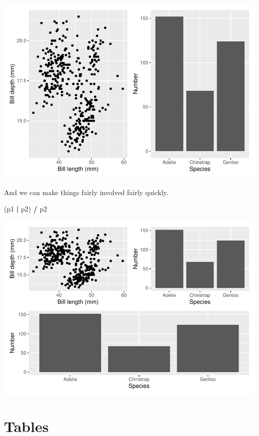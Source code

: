 \documentclass[
]{book}
\newenvironment{Shaded}{\begin{snugshade}}{\end{snugshade}}
\newcommand{\NormalTok}[1]{#1}
\newcommand{\OperatorTok}[1]{\textcolor[rgb]{0.81,0.36,0.00}{\textbf{#1}}}
\newcommand{\StringTok}[1]{\textcolor[rgb]{0.31,0.60,0.02}{#1}}
\begin{document}
\includegraphics{telling_stories_with_data_files/figure-latex/unnamed-chunk-92-1.pdf}

And we can make things fairly involved fairly quickly.

\begin{Shaded}
\begin{Highlighting}[]
\NormalTok{(p1 }\OperatorTok{|}\StringTok{ }\NormalTok{p2) }\OperatorTok{/}
\StringTok{  }\NormalTok{p2}
\end{Highlighting}
\end{Shaded}

\includegraphics{telling_stories_with_data_files/figure-latex/unnamed-chunk-93-1.pdf}

\hypertarget{tables}{%
\section{Tables}\label{tables}}
\end{document}

